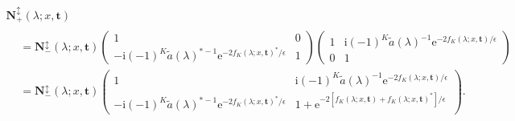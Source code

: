 \documentclass[12pt]{amsart}
\numberwithin{equation}{section}
\newcommand{\ee}{\mathrm{e}}
\newcommand{\ii}{\mathrm{i}}
\newcommand{\SP}{\lambda}
\begin{document}
\begin{rem}
\begin{multline}
\mathbf{N}^\updownarrow_+(\SP;x,\mathbf{t})\\
\begin{aligned}
&=\mathbf{N}^\updownarrow_-(\SP;x,\mathbf{t})\begin{pmatrix}1&0\\-\ii (-1)^K\widetilde{a}(\SP)^{*-1}\ee^{-2f_K(\SP;x,\mathbf{t})^*/\epsilon} & 1\end{pmatrix}\begin{pmatrix}1&\ii (-1)^K\widetilde{a}(\SP)^{-1}\ee^{-2f_K(\SP;x,\mathbf{t})/\epsilon} \\0 & 1\end{pmatrix}\\
&=\mathbf{N}^\updownarrow_-(\SP;x,\mathbf{t})\begin{pmatrix}1 & \ii (-1)^K\widetilde{a}(\SP)^{-1}\ee^{-2f_K(\SP;x,\mathbf{t})/\epsilon}\\
-\ii(-1)^K\widetilde{a}(\SP)^{*-1}\ee^{-2f_K(\SP;x,\mathbf{t})^*/\epsilon} & 1+\ee^{-2[f_K(\SP;x,\mathbf{t})+f_K(\SP;x,\mathbf{t})^*]/\epsilon}\end{pmatrix}.
\end{aligned}
\end{multline}
\end{rem}
\end{document}
